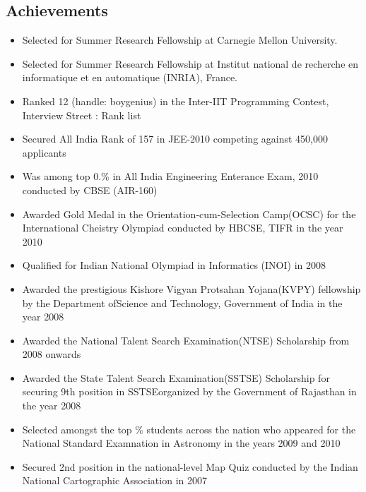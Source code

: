 \documentclass[margin,line]{resume}
\begin{document}
\begin{resume}
  \section{\mysidestyle Achievements}
  \begin{itemize}
  \item Selected for Summer Research Fellowship at Carnegie Mellon University.
  \item Selected for Summer Research Fellowship at Institut national de recherche en informatique et en automatique (INRIA), France.
  \item Ranked 12 (handle: boygenius) in the Inter-IIT Programming Contest, Interview Street : Rank list
  \item Secured All India Rank of 157 in JEE-2010 competing against 450,000 applicants
  \item Was among top 0.\% in All India Engineering Enterance Exam, 2010 conducted by CBSE (AIR-160)
  \item Awarded Gold Medal in the Orientation-cum-Selection Camp(OCSC) for the International Cheistry Olympiad conducted by HBCSE, TIFR in the year 2010
  \item Qualified for Indian National Olympiad in Informatics (INOI) in 2008
  \item Awarded the prestigious Kishore Vigyan Protsahan Yojana(KVPY) fellowship by the Department ofScience and Technology, Government of India in the year 2008
  \item Awarded the National Talent Search Examination(NTSE) Scholarship from 2008 onwards
  \item Awarded the State Talent Search Examination(SSTSE) Scholarship for securing 9th position in SSTSEorganized by the Government of Rajasthan in the year 2008
  \item Selected amongst the top \% students across the nation who appeared for the National Standard Examnation in Astronomy in the years 2009 and 2010
  \item Secured 2nd position in the national-level Map Quiz conducted by the Indian National Cartographic Association in 2007
  \end{itemize}

\end{resume}
\end{document}
